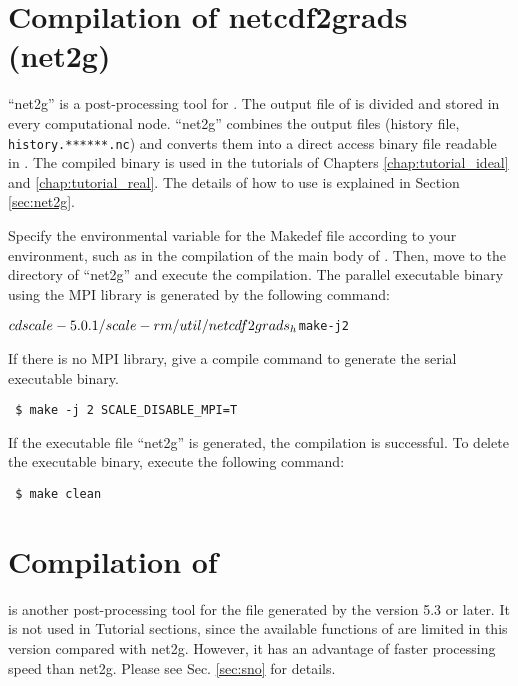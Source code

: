 \section{Compilation of netcdf2grads (net2g)} \label{sec:compile_net2g}

``net2g'' is a post-processing tool for \scalerm.
The output file of \scalerm is divided and stored in every computational node.
``net2g'' combines the output files (history file, \verb|history.******.nc|)
and converts them into a direct access binary file readable in \grads.
The compiled binary is used in the tutorials of Chapters \ref{chap:tutorial_ideal} and \ref{chap:tutorial_real}. The details of how to use is explained in Section \ref{sec:net2g}.

Specify the environmental variable for the Makedef file according to your environment,
such as in the compilation of the main body of \scalelib.
Then, move to the directory of ``net2g'' and execute the compilation. The parallel executable binary using the MPI library is generated by the following command:
\begin{alltt}
 $ cd scale-{\version}/scale-rm/util/netcdf2grads_h
 $ make -j 2
\end{alltt}
If there is no MPI library,
give a compile command to generate the serial executable binary.
\begin{verbatim}
 $ make -j 2 SCALE_DISABLE_MPI=T
\end{verbatim}
If the executable file ``net2g'' is generated, the compilation is successful.
To delete the executable binary, execute the following command:
\begin{verbatim}
 $ make clean
\end{verbatim}


\section{Compilation of \sno } \label{sec:compile_sno}

\sno is another post-processing tool for the \scalenetcdf file generated by the \scalelib version 5.3 or later.
It is not used in Tutorial sections, since the available functions of \sno are limited in this version compared with net2g.
However, it has an advantage of faster processing speed than net2g.
Please see Sec. \ref{sec:sno} for details.

